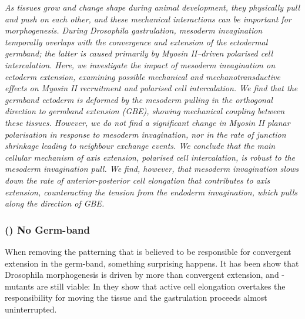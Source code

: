 \textit{As tissues grow and change shape during animal development, they physically pull and push on each other, and these mechanical interactions can be important for morphogenesis. During Drosophila gastrulation, mesoderm invagination temporally overlaps with the convergence and extension of the ectodermal germband; the latter is caused primarily by Myosin II–driven polarised cell intercalation. Here, we investigate the impact of mesoderm invagination on ectoderm extension, examining possible mechanical and mechanotransductive effects on Myosin II recruitment and polarised cell intercalation. We find that the germband ectoderm is deformed by the mesoderm pulling in the orthogonal direction to germband extension (GBE), showing mechanical coupling between these tissues. However, we do not find a significant change in Myosin II planar polarisation in response to mesoderm invagination, nor in the rate of junction shrinkage leading to neighbour exchange events. We conclude that the main cellular mechanism of axis extension, polarised cell intercalation, is robust to the mesoderm invagination pull. We find, however, that mesoderm invagination slows down the rate of anterior-posterior cell elongation that contributes to axis extension, counteracting the tension from the endoderm invagination, which pulls along the direction of GBE.}







\subsubsection{() No Germ-band }
\label{sec:mutantNoGB}
When removing the patterning that is believed to be responsible for convergent extension in the germ-band, something surprising happens. It has been show that Drosophila morphogenesis is driven by more than convergent extension, and -mutants are still viable: In  they show that active cell elongation overtakes the responsibility for moving the tissue and the gastrulation proceeds almost uninterrupted.\\

